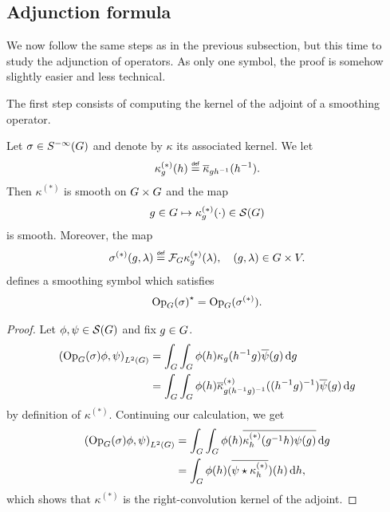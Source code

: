 \subsection{Adjunction formula}

We now follow the same steps as in the previous subsection,
but this time to study the adjunction of operators.
As only one symbol,
the proof is somehow slightly easier and less technical.

The first step consists of computing the kernel of the adjoint of a smoothing operator.

\begin{lemma}
    Let $\sigma \in \SmoothingSymbols$ and denote by $\kappa$ its associated kernel.
    We let
    \begin{align*}
        \kappa_g^{(*)}(h) \defeq \conj \kappa_{g h^{-1}}(h^{-1}).
    \end{align*}
    Then $\kappa^{(*)}$ is smooth on $\Group \times \Group$ and the map
    \begin{align*}
        g \in \Group \mapsto \kappa_g^{(*)}(\dummy) \in \Schwartz \Group
    \end{align*}
    is smooth.
    Moreover,
    the map
    \begin{align*}
        \sigma^{(*)}(g, \lambda)
        \defeq \Fourier \kappa_g^{(*)}(\lambda),
        \quad (g, \lambda) \in \Group \times \VectorSpace.
    \end{align*}
    defines a smoothing symbol which satisfies
    \begin{align*}
        \adj {\Op(\sigma)}
        = \Op(\sigma^{(*)}).
    \end{align*}
\end{lemma}
\begin{proof}
    Let $\phi, \psi \in \Schwartz \Group$ and fix $g \in \Group$.
    \begin{align*}
        \ip [\Lebesgue 2 \Group] {\Op(\sigma) \phi} \psi
        &= \int_\Group \int_\Group \phi(h) \kappa_g(h^{-1} g) \conj \psi(g) \dd g\\
        &= \int_\Group \int_\Group \phi(h) \conj \kappa^{(*)}_{g (h^{-1} g)^{-1}}((h^{-1} g)^{-1}) \conj \psi(g) \dd g
    \end{align*}
    by definition of $\kappa^{(*)}$.
    Continuing our calculation,
    we get
    \begin{align*}
        \ip [\Lebesgue 2 \Group] {\Op(\sigma) \phi} \psi
        &= \int_\Group \int_\Group \phi(h) \conj{\kappa^{(*)}_{h}(g^{-1} h) \psi(g)} \dd g\\
        &= \int_\Group \phi(h) (\conj {\conv \psi {\kappa^{(*)}_h}})(h) \dd h,
    \end{align*}
    which shows that $\kappa^{(*)}$ is the right-convolution kernel of the adjoint.
\end{proof}

